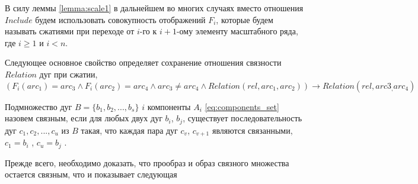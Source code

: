 \begin{remark}
В силу леммы \ref{lemma:scale1}  в дальнейшем во многих случаях вместо отношения $Include$  будем использовать совокупность отображений  $F_i$, которые будем называть сжатиями при переходе от  $i$-го  к $i+1$-ому  элементу масштабного ряда, где  $i \geq 1$ и  $i < n$.
\end{remark}

Следующее основное свойство определяет сохранение отношения связности $Relation$ дуг при сжатии, $$(F_i (arc_1) = arc_3\wedge F_i (arc_2) = arc_4 \wedge arc_3 \neq  arc_4   \wedge  Relation(rel, arc_1, arc_2)) \to Relation(rel, arc3_, arc_4)$$

\begin{definition}
Подмножество дуг $B = \{b_1, b_2, ..., b_s\}$  $i$  компоненты $A_i$ \ref{eq:components_set} назовем  связным, если для любых двух дуг $b_i$, $b_j$, существует последовательность дуг $c_1, c_2, ..., c_u$  из   $B$ такая, что  каждая пара дуг $c_v$, $c_{v+1}$ являются связанными,  $c_1 = b_i$ , $c_u = b_j$ .
\end{definition}

Прежде всего, необходимо доказать, что прообраз и образ связного множества остается связным, что и показывает следующая

